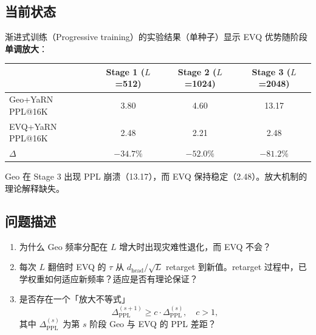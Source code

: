 \documentclass[11pt,a4paper]{article}
\newcommand{\zh}[1]{{\zhfont #1}}
\begin{document}
\subsection*{\zh{当前状态}}
\zh{渐进式训练（}Progressive training\zh{）的实验结果（单种子）显示} EVQ \zh{优势随阶段\textbf{单调放大}：}
\begin{center}
\begin{tabular}{lccc}
\hline
& Stage 1 ($L$=512) & Stage 2 ($L$=1024) & Stage 3 ($L$=2048) \\
\hline
Geo+YaRN PPL@16K & 3.80 & 4.60 & 13.17 \\
EVQ+YaRN PPL@16K & 2.48 & 2.21 & 2.48 \\
$\Delta$ & $-34.7\%$ & $-52.0\%$ & $-81.2\%$ \\
\hline
\end{tabular}
\end{center}
Geo \zh{在} Stage 3 \zh{出现} PPL \zh{崩溃（}13.17\zh{），而} EVQ \zh{保持稳定（}2.48\zh{）。放大机制的理论解释缺失。}

\subsection*{\zh{问题描述}}
\begin{enumerate}[leftmargin=2em]
  \item \zh{为什么} Geo \zh{频率分配在} $L$ \zh{增大时出现灾难性退化，而} EVQ \zh{不会？}
  \item \zh{每次} $L$ \zh{翻倍时} EVQ \zh{的} $\tau$ \zh{从} $d_{\mathrm{head}}/\sqrt{L}$ retarget \zh{到新值。}retarget \zh{过程中，已学权重如何适应新频率？适应是否有理论保证？}
  \item \zh{是否存在一个「放大不等式」}
  \begin{equation}
    \Delta_{\mathrm{PPL}}^{(s+1)} \geq c \cdot \Delta_{\mathrm{PPL}}^{(s)}, \quad c > 1,
  \end{equation}
  \zh{其中} $\Delta_{\mathrm{PPL}}^{(s)}$ \zh{为第} $s$ \zh{阶段} Geo \zh{与} EVQ \zh{的} PPL \zh{差距？}
\end{enumerate}
\end{document}

